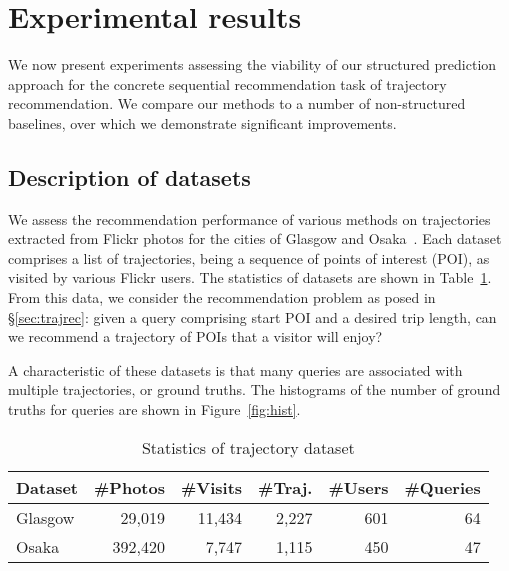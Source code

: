 
\section{Experimental results}
\label{sec:experiment}

We now present experiments assessing the viability of our structured prediction approach
for the concrete sequential recommendation task of
trajectory recommendation.
We compare our methods to a number of non-structured baselines, over which we demonstrate significant improvements.


%
\subsection{Description of datasets}
\label{sec:dataset}

We assess the recommendation performance %
of various methods
on trajectories extracted from Flickr photos
for the cities of Glasgow and Osaka~\cite{thomee2016yfcc100m}.
Each dataset comprises a
list of trajectories, being a sequence of points of interest (POI), as visited by various Flickr users.
The statistics of datasets are shown in Table~\ref{tab:data}.
From this data, we consider the recommendation problem as posed in \S\ref{sec:trajrec}:
given a query comprising start POI and a desired trip length, can we recommend a trajectory of POIs that a visitor will enjoy?

A characteristic of these datasets is that many queries are associated with multiple trajectories, or ground truths.
The histograms of the number of ground truths for queries are shown in Figure~\ref{fig:hist}.

\begin{table}[t]
\caption{Statistics of trajectory dataset}
\label{tab:data}
\centering
\setlength{\tabcolsep}{4pt} %
\small
\begin{tabular}{l*{5}{r}} \hline
\textbf{Dataset} & \textbf{\#Photos} & \textbf{\#Visits} & \textbf{\#Traj.} & \textbf{\#Users} & \textbf{\#Queries} \\ \hline
Glasgow & 29,019 & 11,434 & 2,227 & 601 & 64 \\
Osaka & 392,420 & 7,747 & 1,115 & 450 & 47 \\
\hline
\end{tabular}
\end{table}


